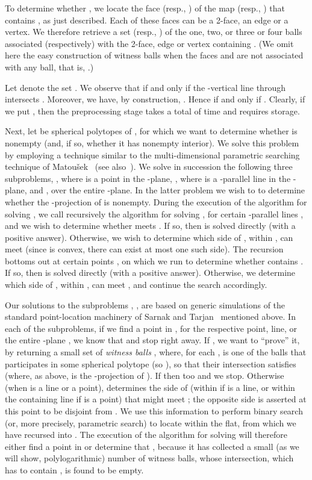 \documentclass[a4paper,12pt]{article}
\begin{document}
To determine whether , we locate the face 
(resp., ) of the map  (resp., ) that contains
, as just described. Each of these faces can be a 2-face, an edge
or a vertex. We therefore retrieve a set  (resp., ) of
the one, two, or three or four balls associated (respectively) with
the 2-face, edge or vertex containing . (We omit here the easy
construction of witness balls when the faces  and 
are not associated with any ball, that is, .)

Let  denote the set . We observe that  if and only if the -vertical line  through 
intersects . Moreover, we have, by construction, . Hence  if and only if
. Clearly,
if we put , then the preprocessing stage
takes a total of  time and requires  storage.

Next, let  be  spherical polytopes of
, for which we want to determine whether  is nonempty (and, if so, whether it has nonempty interior). We
solve this problem by employing a technique similar to the
multi-dimensional parametric searching technique of
Matou\v{s}ek~\cite{JM} (see also~\cite{AES, TCA, CMS, NPT}). We
solve in succession the following three subproblems, ,
where  is a point in the -plane, , where  is a
-parallel line in the -plane, and , over the entire
-plane. In the latter problem we wish to to determine whether
the -projection  of  is nonempty. During the execution
of the algorithm for solving , we call recursively the
algorithm for solving , for certain -parallel lines , and we wish to determine whether  meets
. If so, then  is solved directly (with a positive
answer). Otherwise, we wish to determine which side of , within
, can meet  (since  is convex, there can
exist at most one such side). The recursion bottoms out at certain
points , on which we run  to determine whether
 contains . If so, then  is solved directly (with
a positive answer). Otherwise, we determine which side of ,
within , can meet , and continue the search accordingly.

Our solutions to the subproblems , , are based
on generic simulations of the standard point-location machinery of
Sarnak and Tarjan~\cite{ST} mentioned above. In each of the
subproblems, if we find a point in , for the respective
point, line, or the entire -plane , we know that  and stop right away. If , we want
to ``prove'' it, by returning a small set of \emph{witness balls}
, where, for each ,  is one of the balls
that participates in some spherical polytope  (so ), so that their intersection  satisfies  (where, as above, 
is the -projection of ). If  then  too and we stop. Otherwise (when  is a line or a
point),  determines the side of  (within  if
 is a line, or within the containing line  if  is a point)
that might meet ; the opposite side is asserted at this point
to be disjoint from . We use this information to perform binary
search (or, more precisely, parametric search) to locate 
within the flat, from which we have recursed into .  The
execution of the algorithm for solving  will therefore either
find a point in  or determine that , because it
has collected a small (as we will show, polylogarithmic) number of
witness balls, whose intersection, which has to contain , is
found to be empty.
\end{document}
